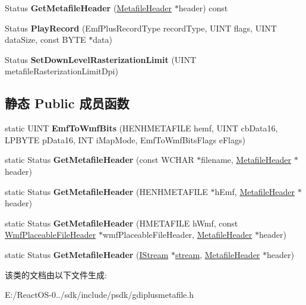 \begin{DoxyCompactItemize}
\item 
\mbox{\label{class_metafile_a02c70e18e7411616a46681e54b805bf8}} 
Status {\bfseries Get\+Metafile\+Header} (\hyperlink{struct_metafile_header}{Metafile\+Header} $\ast$header) const
\item 
\mbox{\label{class_metafile_a240972a9403725a760e664188fde520a}} 
Status {\bfseries Play\+Record} (Emf\+Plus\+Record\+Type record\+Type, U\+I\+NT flags, U\+I\+NT data\+Size, const B\+Y\+TE $\ast$data)
\item 
\mbox{\label{class_metafile_a527f8c5a128c537b828bd67c59f30bc2}} 
Status {\bfseries Set\+Down\+Level\+Rasterization\+Limit} (U\+I\+NT metafile\+Rasterization\+Limit\+Dpi)
\end{DoxyCompactItemize}
\subsection*{静态 Public 成员函数}
\begin{DoxyCompactItemize}
\item 
\mbox{\label{class_metafile_ad5dcf6d43721b2c0e3f100156faccc19}} 
static U\+I\+NT {\bfseries Emf\+To\+Wmf\+Bits} (H\+E\+N\+H\+M\+E\+T\+A\+F\+I\+LE hemf, U\+I\+NT cb\+Data16, L\+P\+B\+Y\+TE p\+Data16, I\+NT i\+Map\+Mode, Emf\+To\+Wmf\+Bits\+Flags e\+Flags)
\item 
\mbox{\label{class_metafile_a87e9d11ecbed160a88aa96ec4e94ace3}} 
static Status {\bfseries Get\+Metafile\+Header} (const W\+C\+H\+AR $\ast$filename, \hyperlink{struct_metafile_header}{Metafile\+Header} $\ast$header)
\item 
\mbox{\label{class_metafile_a7c40b3443cf071f03414957f7b62acd2}} 
static Status {\bfseries Get\+Metafile\+Header} (H\+E\+N\+H\+M\+E\+T\+A\+F\+I\+LE $\ast$h\+Emf, \hyperlink{struct_metafile_header}{Metafile\+Header} $\ast$header)
\item 
\mbox{\label{class_metafile_a3eb2587a8df904dec559b18062b6f114}} 
static Status {\bfseries Get\+Metafile\+Header} (H\+M\+E\+T\+A\+F\+I\+LE h\+Wmf, const \hyperlink{struct_wmf_placeable_file_header}{Wmf\+Placeable\+File\+Header} $\ast$wmf\+Placeable\+File\+Header, \hyperlink{struct_metafile_header}{Metafile\+Header} $\ast$header)
\item 
\mbox{\label{class_metafile_a4843d3775d562ae5c2ed31f6934fefa1}} 
static Status {\bfseries Get\+Metafile\+Header} (\hyperlink{interface_i_stream}{I\+Stream} $\ast$\hyperlink{structstream}{stream}, \hyperlink{struct_metafile_header}{Metafile\+Header} $\ast$header)
\end{DoxyCompactItemize}


该类的文档由以下文件生成\+:\begin{DoxyCompactItemize}
\item 
E\+:/\+React\+O\+S-\/0../sdk/include/psdk/gdiplusmetafile.\+h\end{DoxyCompactItemize}
